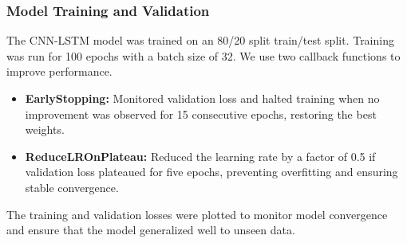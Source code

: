 \subsubsection{Model Training and Validation}
The CNN-LSTM model was trained on an 80/20 split train/test split. Training was run for 100 epochs with a batch size of 32. We use two callback functions to improve performance.
{\small
\begin{itemize}
	\item \textbf{EarlyStopping:} Monitored validation loss and halted training when no improvement was observed for 15 consecutive epochs, restoring the best weights.
	\item \textbf{ReduceLROnPlateau:} Reduced the learning rate by a factor of 0.5 if validation loss plateaued for five epochs, preventing overfitting and ensuring stable convergence.
\end{itemize}}
The training and validation losses were plotted to monitor model convergence and ensure that the model generalized well to unseen data.
































